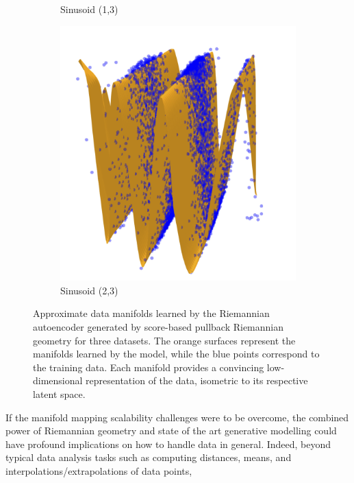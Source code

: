 \begin{figure}[t]
\begin{subfigure}[b]{0.32\textwidth}
        \caption{Sinusoid (1,3)}
    \end{subfigure}
    \hfill
    \begin{subfigure}[b]{0.32\textwidth}
        \centering
        \includegraphics[width=\textwidth]{Chapter5/results/visualisations/RAE/projections/sinusoid_2_3/riemannian_autoencoder.jpg}
        \caption{Sinusoid (2,3)}
    \end{subfigure}

    \caption{
        Approximate data manifolds learned by the Riemannian autoencoder generated by score-based pullback Riemannian geometry for three datasets. The orange surfaces represent the manifolds learned by the model, while the blue points correspond to the training data. Each manifold provides a convincing low-dimensional representation of the data, isometric to its respective latent space.
    }
    \label{fig:learned_charts}
\end{figure}

If the manifold mapping scalability challenges were to be overcome, the combined power of Riemannian geometry and state of the art generative modelling could have profound implications on how to handle data in general. 
Indeed, beyond typical data analysis tasks such as computing distances, means, and interpolations/extrapolations of data points,

